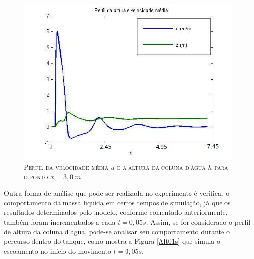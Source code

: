  \begin{figure}[H]
 	\centering
 	\includegraphics[scale=1]{figuras/perfil30s.jpg}
 	\caption{\textsc{Perfil da velocidade média $u$ e a altura da coluna d'água $h$ para o ponto $x=3,0 \ m$}}
 	\vspace{-0.1cm}
 	\label{perfi30s}
 \end{figure}
 
 Outra forma de análise que pode ser realizada no experimento é verificar o comportamento da massa líquida em certos tempos de simulação, já que os resultados determinados pelo modelo, conforme comentado anteriormente, também foram incrementados a cada $t=0,05s$. Assim, se for considerado o perfil de altura da coluna d'água, pode-se analisar seu comportamento durante o percurso dentro do tanque, como mostra a Figura \ref{Alt01s} que simula o escoamento no início do movimento $t=0,05s$.
 
